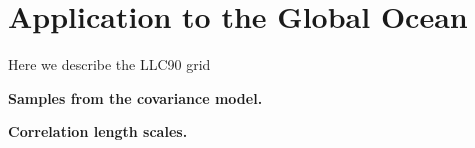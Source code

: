 \section{Application to the Global Ocean}
\label{sec:llc90}

Here we describe the LLC90 grid

\noindent\textbf{Samples from the covariance model.}



\noindent\textbf{Correlation length scales.}

